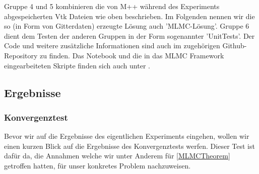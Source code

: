 Gruppe 4 und 5 kombinieren die von M++ während des Experiments abgespeicherten Vtk Dateien wie oben beschrieben. Im Folgenden nennen wir die so (in Form von Gitterdaten) erzeugte Lösung auch 'MLMC-Lösung'.
Gruppe 6 dient dem Testen der anderen Gruppen in der Form sogenannter 'UnitTests'.
Der Code und weitere zusätzliche Informationen sind auch im zugehörigen Github-Repository \cite{githubvtk} zu finden. Das Notebook und die in das MLMC Framework eingearbeiteten Skripte finden sich auch unter \cite{branchMLMCTP}.

\subsection{Ergebnisse}
\subsubsection{Konvergenztest}
Bevor wir auf die Ergebnisse des eigentlichen Experiments eingehen, wollen wir einen kurzen Blick auf die Ergebnisse des Konvergenztests werfen. Dieser Test ist dafür da, die Annahmen welche wir unter Anderem für \eqref{MLMCTheorem} getroffen hatten, für unser konkretes Problem nachzuweisen.



